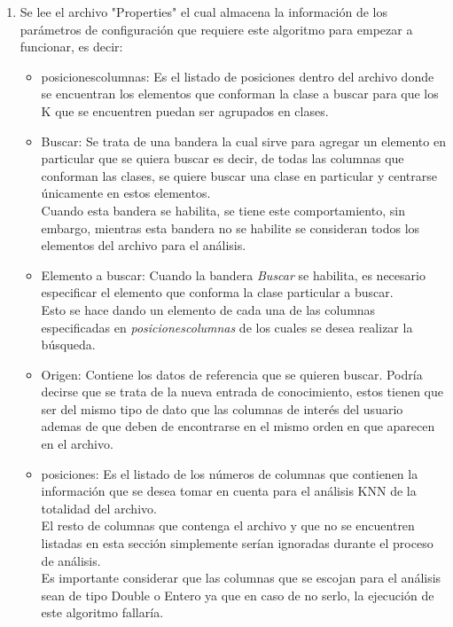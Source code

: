 \begin{enumerate}
	\item Se lee el archivo "Properties" el cual almacena la información de los parámetros de configuración que requiere este algoritmo para empezar a funcionar, es decir:
	\begin{itemize}
		\item posicionescolumnas: Es el listado de posiciones dentro del archivo donde se encuentran los elementos que conforman la clase a buscar para que los K que se encuentren puedan ser agrupados en clases.\\ 
		\item Buscar: Se trata de una bandera la cual sirve para agregar un elemento en particular que se quiera buscar es decir, de todas las columnas que conforman las clases, se quiere buscar una clase en particular y centrarse únicamente en estos elementos. \\
		Cuando esta bandera se habilita, se tiene este comportamiento, sin embargo, mientras esta bandera no se habilite se consideran todos los elementos del archivo para el análisis.\\
		\item Elemento a buscar: Cuando la bandera \emph{Buscar} se habilita, es necesario especificar el elemento que conforma la clase particular a buscar. \\
		Esto se hace dando un elemento de cada una de las columnas especificadas en \emph{posicionescolumnas} de los cuales se desea realizar la búsqueda.\\
		\item Origen: Contiene los datos de referencia que se quieren buscar. Podría decirse que se trata de la nueva entrada de conocimiento, estos tienen que ser del mismo tipo de dato que las columnas de interés del usuario ademas de que deben de encontrarse en el mismo orden en que aparecen en el archivo.
		\\
		\item posiciones: Es el listado de los números de columnas que contienen la información que se desea tomar en cuenta para el análisis KNN de la totalidad del archivo.\\
		El resto de columnas que contenga el archivo y que no se encuentren listadas en esta sección simplemente serían ignoradas durante el proceso de análisis. 
		\\
		Es importante considerar que las columnas que se escojan para el análisis sean de tipo Double o Entero ya que en caso de no serlo, la ejecución de este algoritmo fallaría.

\end{itemize}
\end{enumerate}
